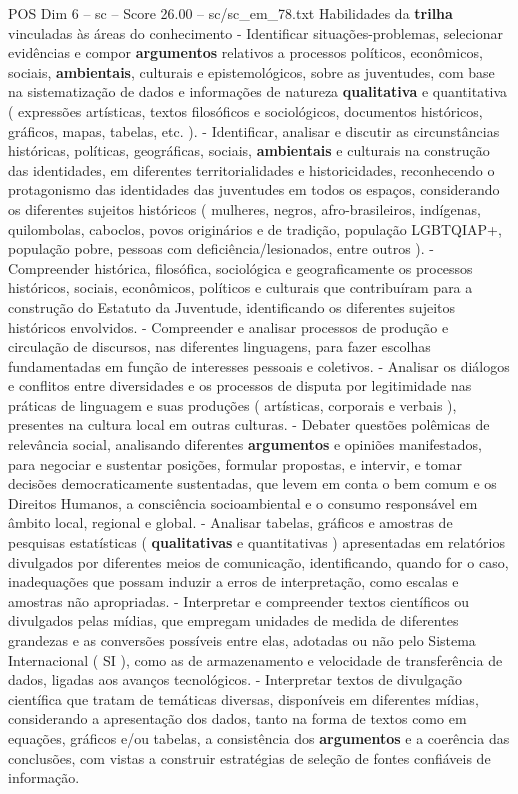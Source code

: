 \begin{textsample}{POS Dim 6 – sc – Score 26.00 – sc/sc\_em\_78.txt}
Habilidades da \textbf{trilha} vinculadas às áreas do conhecimento - Identificar situações-problemas, selecionar evidências e compor \textbf{argumentos} relativos a processos políticos, econômicos, sociais, \textbf{ambientais}, culturais e epistemológicos, sobre as juventudes, com base na sistematização de dados e informações de natureza \textbf{qualitativa} e quantitativa ( expressões artísticas, textos filosóficos e sociológicos, documentos históricos, gráficos, mapas, tabelas, etc. ). - Identificar, analisar e discutir as circunstâncias históricas, políticas, geográficas, sociais, \textbf{ambientais} e culturais na construção das identidades, em diferentes territorialidades e historicidades, reconhecendo o protagonismo das identidades das juventudes em todos os espaços, considerando os diferentes sujeitos históricos ( mulheres, negros, afro-brasileiros, indígenas, quilombolas, caboclos, povos originários e de tradição, população LGBTQIAP+, população pobre, pessoas com deficiência/lesionados, entre outros ). - Compreender histórica, filosófica, sociológica e geograficamente os processos históricos, sociais, econômicos, políticos e culturais que contribuíram para a construção do Estatuto da Juventude, identificando os diferentes sujeitos históricos envolvidos. - Compreender e analisar processos de produção e circulação de discursos, nas diferentes linguagens, para fazer escolhas fundamentadas em função de interesses pessoais e coletivos. - Analisar os diálogos e conflitos entre diversidades e os processos de disputa por legitimidade nas práticas de linguagem e suas produções ( artísticas, corporais e verbais ), presentes na cultura local em outras culturas. - Debater questões polêmicas de relevância social, analisando diferentes \textbf{argumentos} e opiniões manifestados, para negociar e sustentar posições, formular propostas, e intervir, e tomar decisões democraticamente sustentadas, que levem em conta o bem comum e os Direitos Humanos, a consciência socioambiental e o consumo responsável em âmbito local, regional e global. - Analisar tabelas, gráficos e amostras de pesquisas estatísticas ( \textbf{qualitativas} e quantitativas ) apresentadas em relatórios divulgados por diferentes meios de comunicação, identificando, quando for o caso, inadequações que possam induzir a erros de interpretação, como escalas e amostras não apropriadas. - Interpretar e compreender textos científicos ou divulgados pelas mídias, que empregam unidades de medida de diferentes grandezas e as conversões possíveis entre elas, adotadas ou não pelo Sistema Internacional ( SI ), como as de armazenamento e velocidade de transferência de dados, ligadas aos avanços tecnológicos. - Interpretar textos de divulgação científica que tratam de temáticas diversas, disponíveis em diferentes mídias, considerando a apresentação dos dados, tanto na forma de textos como em equações, gráficos e/ou tabelas, a consistência dos \textbf{argumentos} e a coerência das conclusões, com vistas a construir estratégias de seleção de fontes confiáveis de informação.

\end{textsample}
